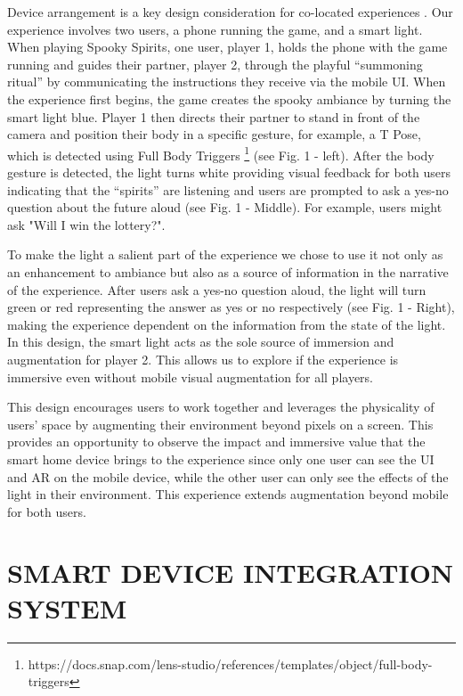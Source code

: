 \documentclass[sigconf, language=french,
language=german, language=spanish, language=english]{acmart}
\begin{document}
Device arrangement is a key design consideration for co-located
experiences \cite{isbister2018social}\cite{lundgren2015designing}. Our experience involves two users, a phone
running the game, and a smart light. When playing Spooky Spirits, one user, player 1, holds the phone with the game running and
guides their partner, player 2, through the playful “summoning
ritual” by communicating the instructions they receive via the
mobile UI. When the experience first begins, the game creates the
spooky ambiance by turning the smart light blue. Player 1 then
directs their partner to stand in front of the camera and position
their body in a specific gesture, for example, a T Pose, which is
detected using Full Body Triggers \footnote{https://docs.snap.com/lens-studio/references/templates/object/full-body-triggers}
(see Fig. 1 - left). After the body
gesture is detected, the light turns white providing visual feedback
for both users indicating that the “spirits” are listening and users are
prompted to ask a yes-no question about the future aloud (see Fig.
1 - Middle). For example, users might ask "Will I win the lottery?".


To make the light a salient part of the experience we chose to
use it not only as an enhancement to ambiance but also as a source
of information in the narrative of the experience. After users ask a
yes-no question aloud, the light will turn green or red representing
the answer as yes or no respectively (see Fig. 1 - Right), making the
experience dependent on the information from the state of the light.
In this design, the smart light acts as the sole source of immersion
and augmentation for player 2. This allows us to explore if the
experience is immersive even without mobile visual augmentation
for all players.


This design encourages users to work together and leverages
the physicality of users’ space by augmenting their environment
beyond pixels on a screen. This provides an opportunity to observe
the impact and immersive value that the smart home device brings
to the experience since only one user can see the UI and AR on the
mobile device, while the other user can only see the effects of the
light in their environment. This experience extends augmentation
beyond mobile for both users.

\section{ SMART DEVICE INTEGRATION SYSTEM}
\end{document}
